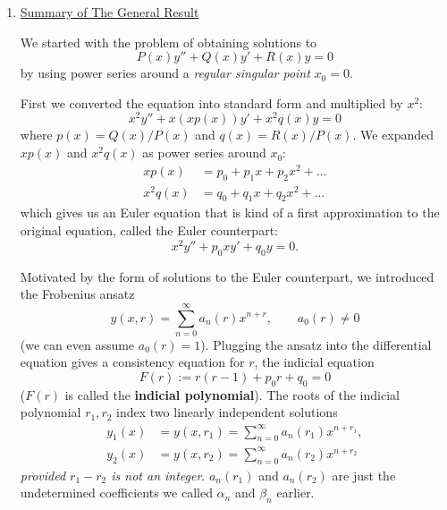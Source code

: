 \documentclass[11pt, letterpaper, oneside]{article}     %
\numberwithin{equation}{subsection}
\theoremstyle{definition}
\numberwithin{theorem}{section}
\theoremstyle{remark}
\begin{document}
\begin{enumerate}
  The moral of the story is that we have to settle for something weaker. The true result is that whenever $r_1 - r_2$ is \emph{not an integer}, then $y_1$ and $y_2$ as constructed from the Frobenius ansatz will be linearly independent (even if the differential equation forces $\alpha_0 = 0$ or $\beta_0 = 0$). We will revisit this result soon.

\item \underline{Summary of The General Result}

  We started with the problem of obtaining solutions to
  \begin{equation}
    P(x)y'' + Q(x)y' + R(x)y = 0
  \end{equation}
  by using power series around a \emph{regular singular point} $x_0 = 0$.

  First we converted the equation into standard form and multiplied by $x^2$:
  \begin{equation}
    x^2y'' + x(xp(x))y' + x^2q(x)y = 0
  \end{equation}
  where $p(x) = Q(x)/P(x)$ and $q(x) = R(x)/P(x)$.
  We expanded $xp(x)$ and $x^2q(x)$ as power series around $x_0$:
  \begin{align*}
    xp(x) &= p_0 + p_1x + p_2x^2 + \dots\\
    x^2q(x) &= q_0 + q_1x + q_2x^2 + \dots
  \end{align*}
  which gives us an Euler equation that is kind of a first approximation to the original equation, called the Euler counterpart:
  \begin{equation}
    x^2y'' + p_0xy' + q_0y = 0.
  \end{equation}

  Motivated by the form of solutions to the Euler counterpart, we introduced the Frobenius ansatz
  \begin{equation}
    y(x,r) = \sum_{n=0}^\infty a_n(r)x^{n+r},\quad\quad
    a_0(r) \neq 0
  \end{equation}
  (we can even assume $a_0(r) = 1$). Plugging the ansatz into the differential equation gives a consistency equation for $r$, the indicial equation
  \begin{equation}
    F(r) := r(r-1) + p_0 r + q_0 = 0
  \end{equation}
  ($F(r)$ is called the \textbf{indicial polynomial}). The roots of the indicial polynomial $r_1,r_2$ index two linearly independent solutions
  \begin{align}
    y_1(x) &= y(x,r_1) = \sum_{n=0}^\infty a_n(r_1)x^{n+r_1},\\
    y_2(x) &= y(x,r_2) = \sum_{n=0}^\infty a_n(r_2)x^{n+r_2}
  \end{align}
  \emph{provided $r_1 - r_2$ is not an integer}. $a_n(r_1)$ and $a_n(r_2)$ are just the undetermined coefficients we called $\alpha_n$ and $\beta_n$ earlier.


\end{enumerate}
\end{document}
